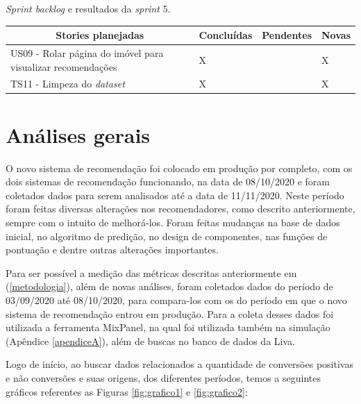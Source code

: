 \begin{quadro}[H]
\centering
\caption[\textit{Sprint backlog} e resultados da \textit{sprint} 5]{\textit{Sprint backlog} e resultados da \textit{sprint} 5.}
\label{quadro:sprint5}
\begin{tabular}{|p{6cm}|p{2cm}|p{2cm}|p{1cm}|}
\hline
\multicolumn{1}{|c|}{\textbf{Stories planejadas}} & \multicolumn{1}{c|}{\textbf{Concluídas}} & \multicolumn{1}{c|}{\textbf{Pendentes}} & \multicolumn{1}{c|}{\textbf{Novas}} \\ \hline
US09 - Rolar página do imóvel para visualizar recomendações & X &  & X \\ \hline
TS11 - Limpeza do \textit{dataset} & X &  & X \\ \hline
\end{tabular}
\end{quadro}

\section{Análises gerais}
\label{analise_gerais}

O novo sistema de recomendação foi colocado em produção por completo, com os dois sistemas de recomendação funcionando, na data de 08/10/2020 e foram coletados dados para serem analisados até a data de 11/11/2020. Neste período foram feitas diversas alterações nos recomendadores, como descrito anteriormente, sempre com o intuito de melhorá-los. Foram feitas mudanças na base de dados inicial, no algoritmo de predição, no design de componentes, nas funções de pontuação e dentre outras alterações importantes.

Para ser possível a medição das métricas descritas anteriormente em (\ref{metodologia}), além de novas análises, foram coletados dados do período de 03/09/2020 até 08/10/2020, para compara-los com os do período em que o novo sistema de recomendação entrou em produção. Para a coleta desses dados foi utilizada a ferramenta MixPanel, na qual foi utilizada também na simulação (Apêndice \ref{apendiceA}), além de buscas no banco de dados da Liva.

Logo de início, ao buscar dados relacionados a quantidade de conversões positivas e não conversões e suas origens, dos diferentes períodos, temos a seguintes gráficos referentes as Figuras \ref{fig:grafico1} e \ref{fig:grafico2}:

